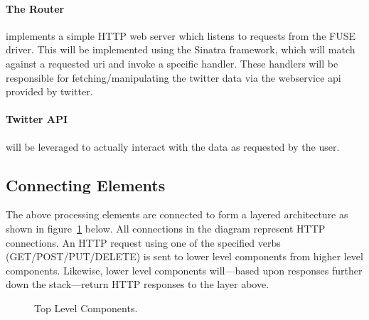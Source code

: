 \paragraph{The Router} implements a simple HTTP web server which listens to requests from
the FUSE driver. This will be implemented using the Sinatra framework, which
will match against a requested uri and invoke a specific handler. These handlers
will be responsible for fetching/manipulating the twitter data via the
webservice api provided by twitter.

\paragraph{Twitter API} will be leveraged to actually interact with the data as
requested by the user.

\subsection{Connecting Elements}

The above processing elements are connected to form a layered architecture as
shown in figure~\ref{fig:top-top} below. All connections in the diagram
represent HTTP connections. An HTTP request using one of the specified verbs
(GET/POST/PUT/DELETE) is sent to lower level components from higher level
components. Likewise, lower level components will---based upon responses further
down the stack---return HTTP responses to the layer above.

\begin{figure}[h]
\centering
{}
\caption{Top Level Components.}\label{fig:top-top}
\end{figure}

